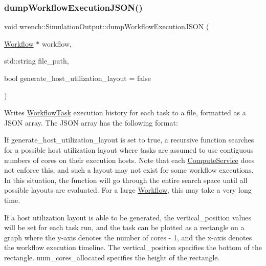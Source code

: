 \subsubsection{\texorpdfstring{dump\+Workflow\+Execution\+J\+S\+O\+N()}{dumpWorkflowExecutionJSON()}}
{\footnotesize\ttfamily void wrench\+::\+Simulation\+Output\+::dump\+Workflow\+Execution\+J\+S\+ON (\begin{DoxyParamCaption}\item[{\hyperlink{classwrench_1_1_workflow}{Workflow} $\ast$}]{workflow,  }\item[{std\+::string}]{file\+\_\+path,  }\item[{bool}]{generate\+\_\+host\+\_\+utilization\+\_\+layout = {\ttfamily false} }\end{DoxyParamCaption})}



Writes \hyperlink{classwrench_1_1_workflow_task}{Workflow\+Task} execution history for each task to a file, formatted as a J\+S\+ON array.  The J\+S\+ON array has the following format\+: 


\begin{DoxyPre}
\end{DoxyPre}


If generate\+\_\+host\+\_\+utilization\+\_\+layout is set to true, a recursive function searches for a possible host utilization layout where tasks are assumed to use contiguous numbers of cores on their execution hosts. Note that each \hyperlink{classwrench_1_1_compute_service}{Compute\+Service} does not enforce this, and such a layout may not exist for some workflow executions. In this situation, the function will go through the entire search space until all possible layouts are evaluated. For a large \hyperlink{classwrench_1_1_workflow}{Workflow}, this may take a very long time.

If a host utilization layout is able to be generated, the \textquotesingle{}vertical\+\_\+position\textquotesingle{} values will be set for each task run, and the task can be plotted as a rectangle on a graph where the y-\/axis denotes the number of cores -\/ 1, and the x-\/axis denotes the workflow execution timeline. The vertical\+\_\+position specifies the bottom of the rectangle. num\+\_\+cores\+\_\+allocated specifies the height of the rectangle.


